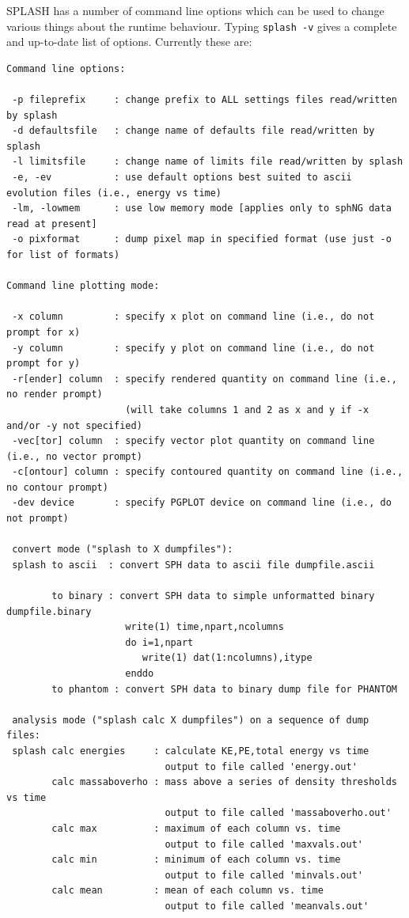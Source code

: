 \documentclass[a4paper,10pt]{article}
\newcommand{\splash}{\textsc{SPLASH }}
\begin{document}
 \splash has a number of command line options which can be used to change various things about the runtime behaviour. Typing \verb+splash -v+ gives a complete and up-to-date list of options. Currently these are:
\begin{verbatim}
Command line options:

 -p fileprefix     : change prefix to ALL settings files read/written by splash 
 -d defaultsfile   : change name of defaults file read/written by splash
 -l limitsfile     : change name of limits file read/written by splash
 -e, -ev           : use default options best suited to ascii evolution files (i.e., energy vs time)
 -lm, -lowmem      : use low memory mode [applies only to sphNG data read at present]
 -o pixformat      : dump pixel map in specified format (use just -o for list of formats)

Command line plotting mode:

 -x column         : specify x plot on command line (i.e., do not prompt for x)
 -y column         : specify y plot on command line (i.e., do not prompt for y)
 -r[ender] column  : specify rendered quantity on command line (i.e., no render prompt)
                     (will take columns 1 and 2 as x and y if -x and/or -y not specified)
 -vec[tor] column  : specify vector plot quantity on command line (i.e., no vector prompt)
 -c[ontour] column : specify contoured quantity on command line (i.e., no contour prompt)
 -dev device       : specify PGPLOT device on command line (i.e., do not prompt)

 convert mode ("splash to X dumpfiles"): 
 splash to ascii  : convert SPH data to ascii file dumpfile.ascii

        to binary : convert SPH data to simple unformatted binary dumpfile.binary 
                     write(1) time,npart,ncolumns
                     do i=1,npart
                        write(1) dat(1:ncolumns),itype
                     enddo
        to phantom : convert SPH data to binary dump file for PHANTOM

 analysis mode ("splash calc X dumpfiles") on a sequence of dump files: 
 splash calc energies     : calculate KE,PE,total energy vs time
                            output to file called 'energy.out'
        calc massaboverho : mass above a series of density thresholds vs time
                            output to file called 'massaboverho.out'
        calc max          : maximum of each column vs. time
                            output to file called 'maxvals.out'
        calc min          : minimum of each column vs. time
                            output to file called 'minvals.out'
        calc mean         : mean of each column vs. time
                            output to file called 'meanvals.out'
\end{verbatim}
\end{document}
